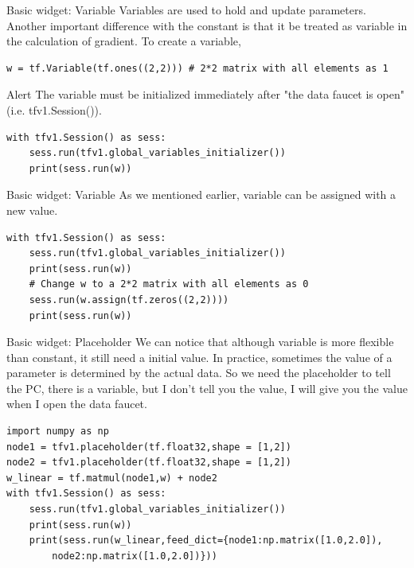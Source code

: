 \documentclass{beamer}
\begin{document}
\begin{frame}[fragile]{Basic widget: Variable}
Variables are used to hold and update parameters. Another important difference with the constant is that it be treated as variable in the calculation of gradient. To create a variable, 
\begin{lstlisting}[style = Python]
w = tf.Variable(tf.ones((2,2))) # 2*2 matrix with all elements as 1
\end{lstlisting}
\begin{alertblock}{Alert}
The variable must be initialized immediately after "the data faucet is open" (i.e. tfv1.Session()).
\end{alertblock}
\begin{lstlisting}[style = Python]
with tfv1.Session() as sess:
    sess.run(tfv1.global_variables_initializer())
    print(sess.run(w))
\end{lstlisting}
\end{frame}

\begin{frame}[fragile]{Basic widget: Variable}
As we mentioned earlier, variable can be assigned with a new value. 
\begin{lstlisting}[style = Python]
with tfv1.Session() as sess:
    sess.run(tfv1.global_variables_initializer())
    print(sess.run(w))
    # Change w to a 2*2 matrix with all elements as 0
    sess.run(w.assign(tf.zeros((2,2)))) 
    print(sess.run(w))
\end{lstlisting}
\end{frame}


\begin{frame}[fragile]{Basic widget: Placeholder}
We can notice that although variable is more flexible than constant, it still need a initial value. In practice, sometimes the value of a parameter is determined by the actual data. So we need the placeholder to tell the PC, there is a variable, but I don't tell you the value, I will give you the value when I open the data faucet.
\begin{lstlisting}[style = Python]
import numpy as np
node1 = tfv1.placeholder(tf.float32,shape = [1,2])
node2 = tfv1.placeholder(tf.float32,shape = [1,2])
w_linear = tf.matmul(node1,w) + node2
with tfv1.Session() as sess:
    sess.run(tfv1.global_variables_initializer())
    print(sess.run(w))
    print(sess.run(w_linear,feed_dict={node1:np.matrix([1.0,2.0]),
    	node2:np.matrix([1.0,2.0])}))
\end{lstlisting}
\end{frame}
\end{document}
